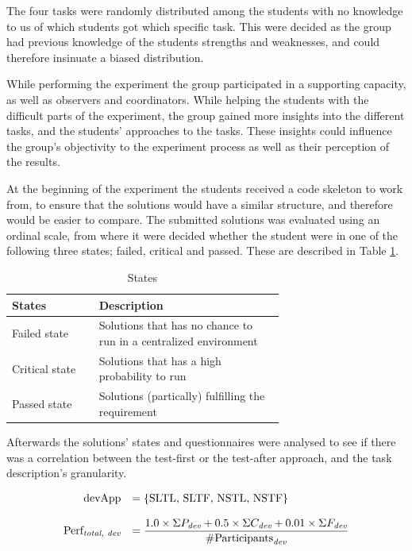 \documentclass{sig-alternate-05-2015}
\begin{document}
The four tasks were randomly distributed among the students with no knowledge to us of which students got which specific task. This were decided as the group had previous knowledge of the students strengths and weaknesses, and could therefore insinuate a biased distribution.

While performing the experiment the group participated in a supporting capacity, as well as observers and coordinators. While helping the students with the difficult parts of the experiment, the group gained more insights into the different tasks, and the students' approaches to the tasks. These insights could influence the group's objectivity to the experiment process as well as their perception of the results.

At the beginning of the experiment the students received a code skeleton to work from, to ensure that the solutions would have a similar structure, and therefore would be easier to compare. The submitted solutions was evaluated using an ordinal scale, from where it were decided whether the student were in one of the following three states; failed, critical and passed. These are described in Table \ref{StatesTable}.

\begin{table}[!ht]
\centering
\caption{States}
\label{StatesTable}
\begin{tabular}{|l|p{0.68\linewidth}|}
\hline
\textbf{States} & \textbf{Description} \\
\hline
\hline
Failed state & Solutions that has no chance to run in a centralized environment \\
Critical state & Solutions that has a high probability to run \\
Passed state & Solutions (partically) fulfilling the  requirement \\
\hline
\end{tabular}
\end{table}

Afterwards the solutions' states and questionnaires were analysed to see if there was a correlation between the test-first or the test-after approach, and the task description's granularity.

\[
\begin{array}{rl}
\text{devApp} &= \{\text{SLTL, SLTF, NSTL, NSTF}\} \\
& \\
\text{Perf}_{\emph{total, dev}} &= \dfrac{1.0\times \Sigma P_{\emph{dev}}+0.5\times \Sigma C_{\emph{dev}}+0.01\times \Sigma F_{\emph{dev}}}{\# \text{Participants}_{\emph{dev}}}
\end{array}
\]
\end{document}
